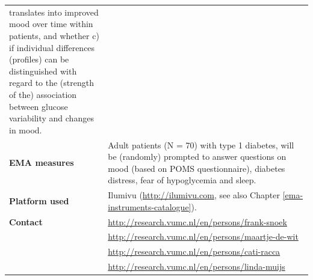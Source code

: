 \documentclass[]{book}
\begin{document}
\begin{longtable}[]{@{}ll@{}}
\begin{minipage}[t]{0.69\columnwidth}
translates into improved mood over time within patients, and whether c)
if individual differences (profiles) can be distinguished with regard to
the (strength of the) association between glucose variability and
changes in mood.\strut
\end{minipage}\tabularnewline
\begin{minipage}[t]{0.25\columnwidth}\raggedright\strut
\textbf{EMA measures}\strut
\end{minipage} & \begin{minipage}[t]{0.69\columnwidth}\raggedright\strut
Adult patients (N = 70) with type 1 diabetes, will be (randomly)
prompted to answer questions on mood (based on POMS questionnaire),
diabetes distress, fear of hypoglycemia and sleep.\strut
\end{minipage}\tabularnewline
\begin{minipage}[t]{0.25\columnwidth}\raggedright\strut
\textbf{Platform used}\strut
\end{minipage} & \begin{minipage}[t]{0.69\columnwidth}\raggedright\strut
Ilumivu (\url{http://ilumivu.com}, see also Chapter
\ref{ema-instruments-catalogue}).\strut
\end{minipage}\tabularnewline
\begin{minipage}[t]{0.25\columnwidth}\raggedright\strut
\textbf{Contact}\strut
\end{minipage} & \begin{minipage}[t]{0.69\columnwidth}\raggedright\strut
\url{http://research.vumc.nl/en/persons/frank-snoek}\strut
\end{minipage}\tabularnewline
\begin{minipage}[t]{0.25\columnwidth}\raggedright\strut
\strut
\end{minipage} & \begin{minipage}[t]{0.69\columnwidth}\raggedright\strut
\url{http://research.vumc.nl/en/persons/maartje-de-wit}\strut
\end{minipage}\tabularnewline
\begin{minipage}[t]{0.25\columnwidth}\raggedright\strut
\strut
\end{minipage} & \begin{minipage}[t]{0.69\columnwidth}\raggedright\strut
\url{http://research.vumc.nl/en/persons/cati-racca}\strut
\end{minipage}\tabularnewline
\begin{minipage}[t]{0.25\columnwidth}\raggedright\strut
\strut
\end{minipage} & \begin{minipage}[t]{0.69\columnwidth}\raggedright\strut
\url{http://research.vumc.nl/en/persons/linda-muijs}\strut
\end{minipage}\tabularnewline
\bottomrule
\end{longtable}
\end{document}
